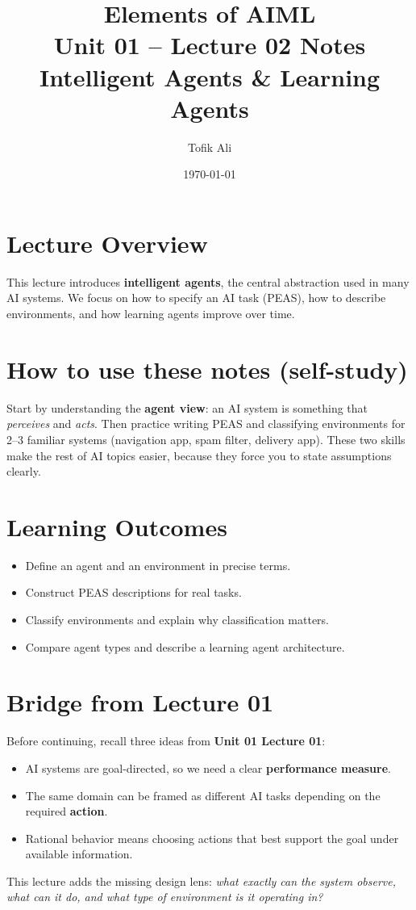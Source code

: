 \documentclass[11pt]{article}
\title{Elements of AIML\\Unit 01 -- Lecture 02 Notes\\Intelligent Agents \& Learning Agents}
\author{Tofik Ali}
\date{\today}
\begin{document}
\maketitle
\tableofcontents

\section{Lecture Overview}
This lecture introduces \textbf{intelligent agents}, the central abstraction used in many AI systems.
We focus on how to specify an AI task (PEAS), how to describe environments, and how learning agents improve over time.
\notesources{\AIMLUnitISources}

\section{How to use these notes (self-study)}
Start by understanding the \textbf{agent view}: an AI system is something that \emph{perceives} and \emph{acts}.
Then practice writing PEAS and classifying environments for 2--3 familiar systems (navigation app, spam filter, delivery app).
These two skills make the rest of AI topics easier, because they force you to state assumptions clearly.

\section{Learning Outcomes}
\begin{itemize}[leftmargin=*]
  \item Define an agent and an environment in precise terms.
  \item Construct PEAS descriptions for real tasks.
  \item Classify environments and explain why classification matters.
  \item Compare agent types and describe a learning agent architecture.
\end{itemize}

\section{Bridge from Lecture 01}
Before continuing, recall three ideas from \textbf{Unit 01 Lecture 01}:
\begin{itemize}[leftmargin=*]
  \item AI systems are goal-directed, so we need a clear \textbf{performance measure}.
  \item The same domain can be framed as different AI tasks depending on the required \textbf{action}.
  \item Rational behavior means choosing actions that best support the goal under available information.
\end{itemize}
This lecture adds the missing design lens: \emph{what exactly can the system observe, what can it do, and what type of environment is it operating in?}
\end{document}
